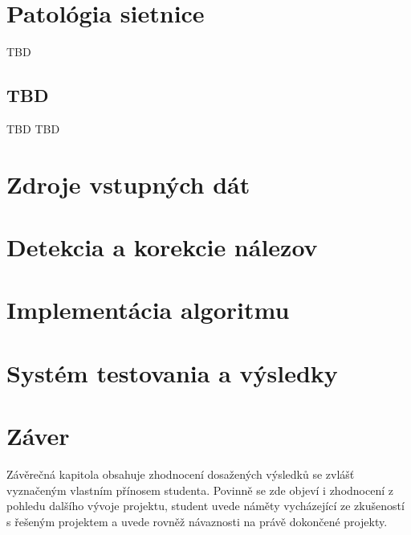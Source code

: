 \chapter{Patológia sietnice}\label{ch:kap2}
TBD\cite{prim}
\section{TBD}
TBD\cite{sec}
TBD\cite{bio}

\chapter{Zdroje vstupných dát}\label{ch:kap3}

\chapter{Detekcia a korekcie nálezov}\label{ch:kap4}

\chapter{Implementácia algoritmu}

\chapter{Systém testovania a výsledky}\label{ch:kap5}

\chapter{Záver}\label{ch:kap6}
Závěrečná kapitola obsahuje zhodnocení dosažených výsledků se zvlášť vyznačeným vlastním přínosem studenta. Povinně se zde objeví i zhodnocení z pohledu dalšího vývoje projektu, student uvede náměty vycházející ze zkušeností s řešeným projektem a uvede rovněž návaznosti na právě dokončené projekty.


